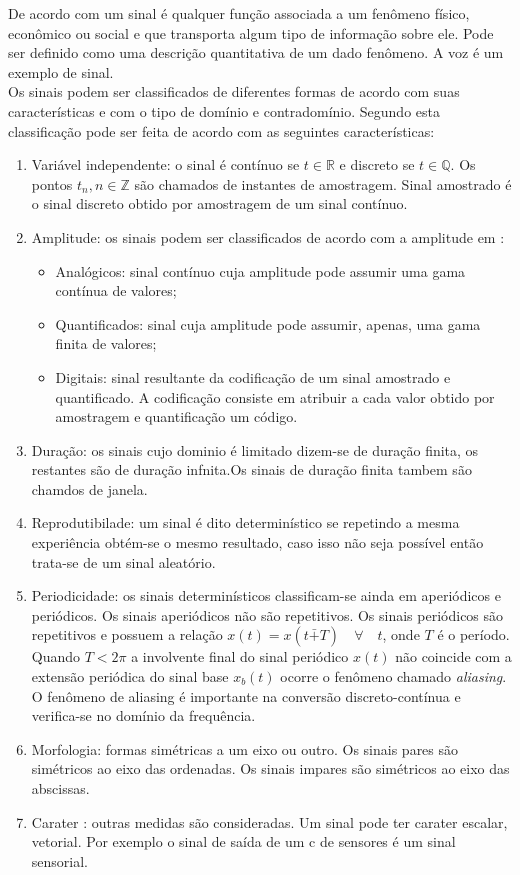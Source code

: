 De acordo com \cite{sig} um sinal é qualquer função associada a um fenômeno físico, econômico ou social e que transporta  algum tipo de informação sobre ele. Pode ser definido como uma descrição quantitativa de um dado fenômeno. A voz é um exemplo de sinal.\\ Os sinais podem ser classificados de diferentes formas de acordo com suas características  e com o tipo de domínio e contradomínio. Segundo \cite{sig} esta classificação pode ser feita de acordo com as seguintes características:
\begin{enumerate}
\item Variável independente: o sinal é contínuo se $t \in \mathbb{R}$ e discreto se $t \in \mathbb{Q}$. Os pontos $t_n, n \in \mathbb{Z}$ são chamados de instantes de amostragem. Sinal amostrado é o sinal discreto obtido por amostragem de um sinal contínuo.

\item Amplitude: os sinais podem ser classificados de acordo com a amplitude em :
\begin{itemize}
\item Analógicos: sinal contínuo cuja amplitude pode assumir uma gama contínua de valores;
\item Quantificados: sinal cuja amplitude pode assumir, apenas, uma gama finita de valores;
\item Digitais: sinal resultante da codificação de um sinal amostrado e quantificado. A codificação consiste em atribuir a cada valor obtido por amostragem e quantificação  um código.
\end{itemize} 
\item Duração: os sinais cujo dominio é limitado dizem-se de duração finita, os restantes são de duração infnita.Os sinais de duração finita tambem são chamdos de janela.
\item Reprodutibilade: um sinal é dito determinístico se repetindo a mesma experiência obtém-se o mesmo resultado, caso isso não seja possível  então trata-se de um sinal aleatório.
\item Periodicidade: os sinais determinísticos classificam-se ainda em aperiódicos e periódicos. Os sinais aperiódicos não são repetitivos. Os sinais periódicos são repetitivos e possuem a relação $x(t) = x(t \bar{+} T) \quad \forall \quad t$, onde $T$ é o período. Quando $T < 2 \pi$ a involvente final do sinal periódico $x(t)$ não coincide com a extensão periódica do sinal base $x_b(t)$ ocorre o fenômeno chamado \textit{aliasing}. O fenômeno de aliasing é importante na conversão discreto-contínua e verifica-se no domínio da frequência.
\item Morfologia: formas simétricas a um eixo ou outro. Os sinais pares são simétricos ao eixo das ordenadas. Os sinais impares são simétricos ao eixo das abscissas.
\item Carater : outras medidas são consideradas. Um sinal pode ter carater escalar, vetorial. Por exemplo o sinal de saída de um c de sensores é um sinal sensorial.
\end{enumerate}

